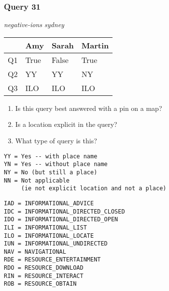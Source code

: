 \begin{frame}[fragile]
\frametitle{Query 31}
\vspace{1em}

\emph{negative-ions sydney}

\vfill

\begin{table}
  \centering
  \begin{tabular}{ l l l l }
    & \textbf{Amy} & \textbf{Sarah} & \textbf{Martin}\\
    \toprule
    Q1 & True & False & True\\
Q2 & YY & YY & NY\\
Q3 & ILO & ILO & ILO\\
    \bottomrule
  \end{tabular}
\end{table}

\vfill

\tiny{

\begin{enumerate}
\item Is this query best answered with a pin on a map?
\item Is a location explicit in the query?
\item What type of query is this?
\end{enumerate}

\vfill

\begin{multicols}{2}
\begin{verbatim}
YY = Yes -- with place name
YN = Yes -- without place name
NY = No (but still a place)
NN = Not applicable 
     (ie not explicit location and not a place)
\end{verbatim}

\columnbreak
\begin{verbatim}
IAD = INFORMATIONAL_ADVICE
IDC = INFORMATIONAL_DIRECTED_CLOSED
IDO = INFORMATIONAL_DIRECTED_OPEN
ILI = INFORMATIONAL_LIST
ILO = INFORMATIONAL_LOCATE
IUN = INFORMATIONAL_UNDIRECTED
NAV = NAVIGATIONAL
RDE = RESOURCE_ENTERTAINMENT
RDO = RESOURCE_DOWNLOAD
RIN = RESOURCE_INTERACT
ROB = RESOURCE_OBTAIN
\end{verbatim}
\end{multicols}
}

\end{frame}


